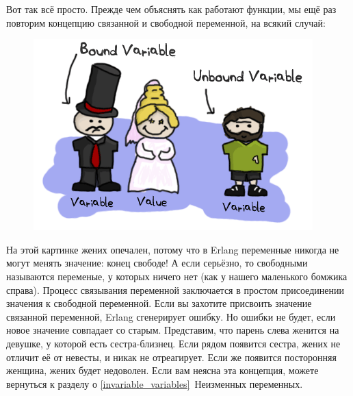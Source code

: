 \documentclass[a4paper,12pt]{report}
\begin{document}
Вот так всё просто. Прежде чем объяснять как работают функции, мы ещё раз повторим концепцию связанной и свободной переменной, на всякий случай:
\begin{figure}
    \includegraphics[width=1\linewidth]{un-bound.png}
\end{figure}
На этой картинке жених опечален, потому что в Erlang переменные никогда не могут менять значение: конец свободе! А если серьёзно, то свободными называются переменые, у которых ничего нет (как у нашего маленького бомжика справа). Процесс связывания переменной заключается в простом присоединении значения к свободной переменной. Если вы захотите присвоить значение связанной переменной, Erlang сгенерирует ошибку. Но ошибки не будет, если новое значение совпадает со старым. Представим, что парень слева женится на девушке, у которой есть сестра\--близнец. Если рядом появится сестра, жених не отличит её от невесты, и никак не отреагирует. Если же появится посторонняя женщина, жених будет недоволен. Если вам неясна эта концепция, можете вернуться к разделу о \ref{invariable_variables}{~Неизменных переменных}.
\end{document}
